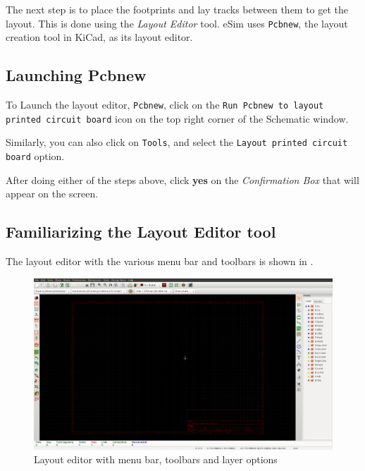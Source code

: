 The next step is to place the footprints and lay tracks between them
to get the layout. This is done using the \textit{Layout Editor}
tool. eSim uses {\tt Pcbnew}, the layout creation tool in KiCad, as
its layout editor.

\subsection{Launching Pcbnew}
\begin{compactenum}
\item To Launch the layout editor, \texttt{Pcbnew}, click on the \texttt{Run Pcbnew to layout printed circuit board} icon on the top right corner of the Schematic window.
\item Similarly, you can also click on \texttt{Tools}, and select the \texttt{Layout printed circuit board} option.
\item After doing either of the steps above, click \textbf{yes} on the \textit{Confirmation Box} that will appear on the screen.
\end{compactenum}

\subsection{Familiarizing the Layout Editor tool}

The layout editor with the various menu bar and toolbars is shown in
.
\begin{figure}
\centering
\includegraphics[width=0.68\linewidth]{NGHDL/toptble.png}
\caption{Layout editor with menu bar, toolbars and layer options}
\label{pcbnew}
\end{figure}


